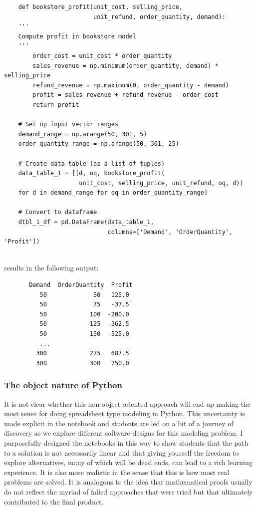 \documentclass[ited,blindrev]{informs3}              %
\begin{document}
\begin{tcolorbox}[left=0mm]
\begin{verbatim}
	def bookstore_profit(unit_cost, selling_price, 
	                     unit_refund, order_quantity, demand):
	'''
	Compute profit in bookstore model
	'''
		order_cost = unit_cost * order_quantity
		sales_revenue = np.minimum(order_quantity, demand) * selling_price
		refund_revenue = np.maximum(0, order_quantity - demand)
		profit = sales_revenue + refund_revenue - order_cost
		return profit
	
	# Set up input vector ranges	
	demand_range = np.arange(50, 301, 5)
	order_quantity_range = np.arange(50, 301, 25)
	
	# Create data table (as a list of tuples)
	data_table_1 = [(d, oq, bookstore_profit(
	                 unit_cost, selling_price, unit_refund, oq, d)) 
	for d in demand_range for oq in order_quantity_range]
	
	# Convert to dataframe
	dtbl_1_df = pd.DataFrame(data_table_1, 
	                         columns=['Demand', 'OrderQuantity', 'Profit'])
	
\end{verbatim}
\end{tcolorbox}

results in the following output:


\begin{tcolorbox}
	\begin{verbatim}
	   Demand  OrderQuantity  Profit
	      50             50   125.0
	      50             75   -37.5
	      50            100  -200.0
	      50            125  -362.5
	      50            150  -525.0
	      ...
	     300            275   687.5
	     300            300   750.0
\end{verbatim}	
\end{tcolorbox}

\subsubsection{The object nature of Python}

It is not clear whether this non-object oriented approach will end up making the most sense for doing spreadsheet type modeling in Python. This uncertainty is made explicit in the notebook and students are led on a bit of a journey of discovery as we explore different software designs for this modeling problem. I purposefully designed the notebooks in this way to show students that the path to a solution is not necessarily linear and that giving yourself the freedom to explore alternatives, many of which will be dead ends, can lead to a rich learning experience. It is also more realistic in the sense that this is how most real problems are solved. It is analogous to the idea that mathematical proofs usually do not reflect the myriad of failed approaches that were tried but that ultimately contributed to the final product.
\end{document}
